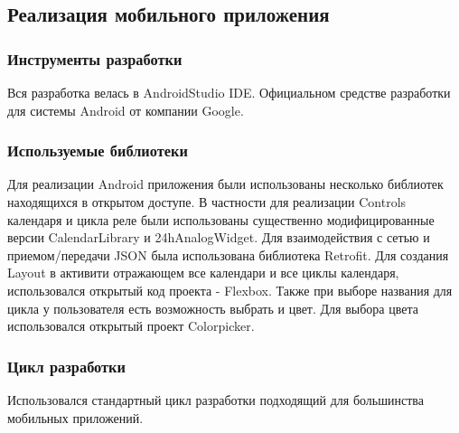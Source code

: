 \subsection{Реализация мобильного приложения}

\subsubsection{Инструменты разработки}
Вся разработка велась в AndroidStudio IDE. Официальном средстве разработки для системы Android от компании Google.

\subsubsection{Используемые библиотеки}
Для реализации Android приложения были использованы несколько библиотек находящихся в открытом доступе. В частности для реализации Controls календаря и цикла реле были использованы существенно модифицированные версии CalendarLibrary и 24hAnalogWidget. Для взаимодействия с сетью и приемом/передачи JSON была использована библиотека Retrofit. Для создания Layout в активити отражающем все календари и все циклы календаря, использовался открытый код проекта - Flexbox. Также при выборе названия для цикла у пользователя есть возможность выбрать и цвет. Для выбора цвета использовался открытый проект Colorpicker.

\subsubsection{Цикл разработки}
Использовался стандартный цикл разработки подходящий для большинства мобильных приложений.
